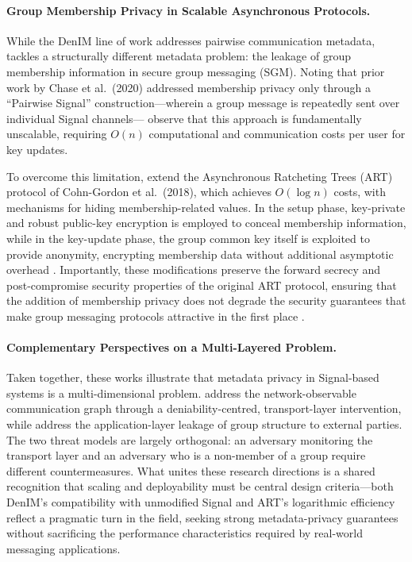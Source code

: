 \paragraph{Group Membership Privacy in Scalable Asynchronous Protocols.}
While the DenIM line of work addresses pairwise communication metadata, \textcite{emura2023} tackles a structurally different metadata problem: the leakage of group membership information in secure group messaging (SGM). Noting that prior work by Chase et al.\ (2020) addressed membership privacy only through a ``Pairwise Signal'' construction—wherein a group message is repeatedly sent over individual Signal channels—\textcite{emura2023} observe that this approach is fundamentally unscalable, requiring \(O(n)\) computational and communication costs per user for key updates.

To overcome this limitation, \textcite{emura2023} extend the Asynchronous Ratcheting Trees (ART) protocol of Cohn-Gordon et al.\ (2018), which achieves \(O(\log n)\) costs, with mechanisms for hiding membership-related values. In the setup phase, key-private and robust public-key encryption is employed to conceal membership information, while in the key-update phase, the group common key itself is exploited to provide anonymity, encrypting membership data without additional asymptotic overhead \parencite{emura2023}. Importantly, these modifications preserve the forward secrecy and post-compromise security properties of the original ART protocol, ensuring that the addition of membership privacy does not degrade the security guarantees that make group messaging protocols attractive in the first place \parencite{emura2023}.

\paragraph{Complementary Perspectives on a Multi-Layered Problem.}
Taken together, these works illustrate that metadata privacy in Signal-based systems is a multi-dimensional problem. \textcite{nelson2022,nelson2024} address the network-observable communication graph through a deniability-centred, transport-layer intervention, while \textcite{emura2023} address the application-layer leakage of group structure to external parties. The two threat models are largely orthogonal: an adversary monitoring the transport layer and an adversary who is a non-member of a group require different countermeasures. What unites these research directions is a shared recognition that scaling and deployability must be central design criteria—both DenIM's compatibility with unmodified Signal \parencite{nelson2022,nelson2024} and ART's logarithmic efficiency \parencite{emura2023} reflect a pragmatic turn in the field, seeking strong metadata-privacy guarantees without sacrificing the performance characteristics required by real-world messaging applications.

